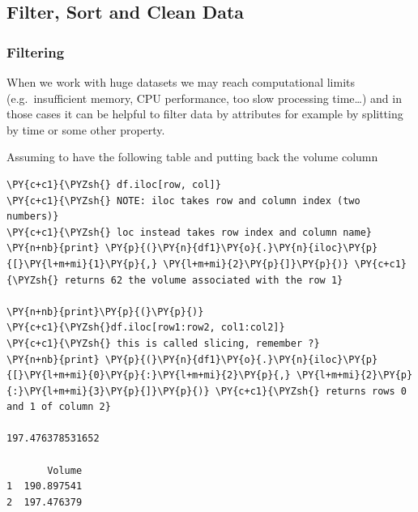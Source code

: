 \subsection{Filter, Sort and Clean Data}\label{filter-sort-and-clean-data}

\subsubsection{Filtering}\label{filtering}

When we work with huge datasets we may reach computational limits (e.g.~insufficient memory, CPU performance, too slow processing time\ldots{}) and in those cases it can be helpful to filter data by attributes for example by splitting by time or some other property.

Assuming to have the following table and putting back the volume column

\begin{tcolorbox}[breakable, size=fbox, boxrule=1pt, pad at break*=1mm,colback=cellbackground, colframe=cellborder]
\begin{Verbatim}[commandchars=\\\{\}]
\PY{c+c1}{\PYZsh{} df.iloc[row, col]}
\PY{c+c1}{\PYZsh{} NOTE: iloc takes row and column index (two numbers)}
\PY{c+c1}{\PYZsh{} loc instead takes row index and column name}
\PY{n+nb}{print} \PY{p}{(}\PY{n}{df1}\PY{o}{.}\PY{n}{iloc}\PY{p}{[}\PY{l+m+mi}{1}\PY{p}{,} \PY{l+m+mi}{2}\PY{p}{]}\PY{p}{)} \PY{c+c1}{\PYZsh{} returns 62 the volume associated with the row 1}

\PY{n+nb}{print}\PY{p}{(}\PY{p}{)}
\PY{c+c1}{\PYZsh{}df.iloc[row1:row2, col1:col2]}
\PY{c+c1}{\PYZsh{} this is called slicing, remember ?}
\PY{n+nb}{print} \PY{p}{(}\PY{n}{df1}\PY{o}{.}\PY{n}{iloc}\PY{p}{[}\PY{l+m+mi}{0}\PY{p}{:}\PY{l+m+mi}{2}\PY{p}{,} \PY{l+m+mi}{2}\PY{p}{:}\PY{l+m+mi}{3}\PY{p}{]}\PY{p}{)} \PY{c+c1}{\PYZsh{} returns rows 0 and 1 of column 2}

197.476378531652

       Volume
1  190.897541
2  197.476379
\end{Verbatim}
\end{tcolorbox}

